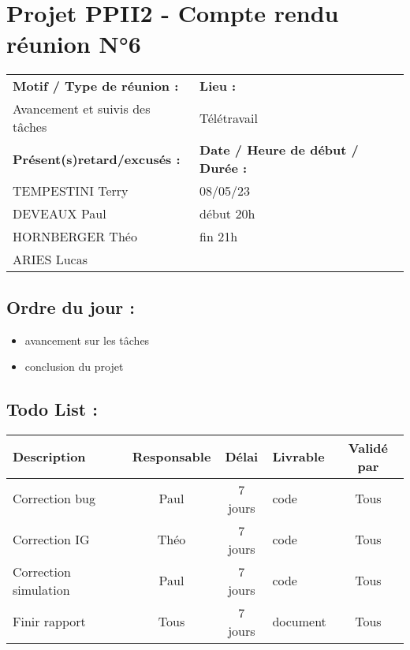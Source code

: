 \documentclass{article}
\begin{document}
\section*{Projet PPII2 - Compte rendu réunion N°6}
\begin{tabular}{|p{7cm}|p{6cm}|}
    \hline
    \textbf{Motif / Type de réunion :}
    & \textbf{Lieu :}
    \\
    Avancement et suivis des tâches
    & 
    Télétravail
    \\ \hline
    \textbf{Présent(s)retard/excusés :}
    &
    \textbf{Date / Heure de début / Durée :}
    \\ 
    TEMPESTINI Terry &  08/05/23\\  
    DEVEAUX Paul & début 20h\\
    HORNBERGER Théo & fin 21h\\
    ARIES Lucas & 
    \\ \hline
\end{tabular}

\subsection*{Ordre du jour :}
\begin{itemize}
    \item{avancement sur les tâches}
    \item{conclusion du projet}
\end{itemize}

\subsection*{Todo List :}
\begin{tabular}{|p{3.5cm}|c|c|p{4.5cm}|c|}
    \hline 
    Description & Responsable & Délai & Livrable & Validé par 
    \\ \hline
    Correction bug & Paul & 7 jours & code & Tous \\ \hline
    Correction IG & Théo & 7 jours & code & Tous \\ \hline
    Correction simulation & Paul & 7 jours & code & Tous \\ \hline
    Finir rapport & Tous & 7 jours & document & Tous \\ \hline
\end{tabular}
\end{document}
